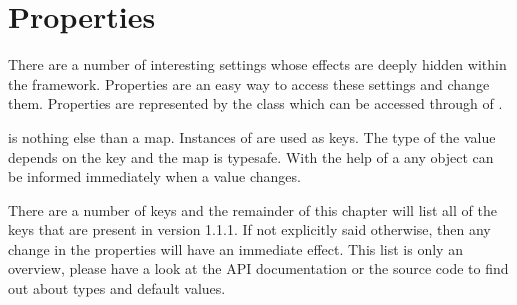 \section{Properties}
There are a number of interesting settings whose effects are deeply hidden within the framework. Properties are an easy way to access these settings and change them. Properties are represented by the class  which can be accessed through  of .

 is nothing else than a map. Instances of  are used as keys. The type of the value depends on the key and the map is typesafe. With the help of a  any object can be informed immediately when a value changes.

There are a number of keys and the remainder of this chapter will list all of the keys that are present in version 1.1.1. If not explicitly said otherwise, then any change in the properties will have an immediate effect. This list is only an overview, please have a look at the API documentation or the source code to find out about types and default values.


